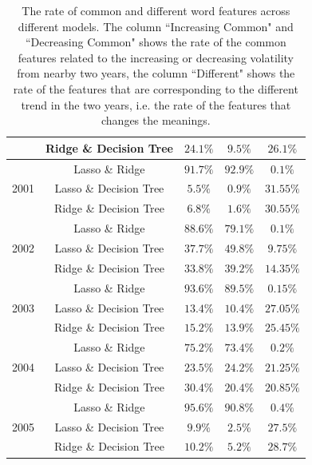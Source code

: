 \documentclass[11pt]{article}
\begin{document}
{\begin{table}[p]
\begin{tabular}{|c|c|c|c|c|}
      \cline{2-5}
                            & Ridge \& Decision Tree & $24.1\%$          & $9.5\%$           & $26.1\%$  \\
      \hline
      \multirow{3}{*}{2001} & Lasso \& Ridge         & $91.7\%$          & $92.9\%$          & $0.1\%$   \\
      \cline{2-5}
                            & Lasso \& Decision Tree & $5.5\%$           & $0.9\%$           & $31.55\%$ \\
      \cline{2-5}
                            & Ridge \& Decision Tree & $6.8\%$           & $1.6\%$           & $30.55\%$ \\
      \hline
      \multirow{3}{*}{2002} & Lasso \& Ridge         & $88.6\%$          & $79.1\%$          & $0.1\%$   \\
      \cline{2-5}
                            & Lasso \& Decision Tree & $37.7\%$          & $49.8\%$          & $9.75\%$  \\
      \cline{2-5}
                            & Ridge \& Decision Tree & $33.8\%$          & $39.2\%$          & $14.35\%$ \\
      \hline
      \multirow{3}{*}{2003} & Lasso \& Ridge         & $93.6\%$          & $89.5\%$          & $0.15\%$  \\
      \cline{2-5}
                            & Lasso \& Decision Tree & $13.4\%$          & $10.4\%$          & $27.05\%$ \\
      \cline{2-5}
                            & Ridge \& Decision Tree & $15.2\%$          & $13.9\%$          & $25.45\%$ \\
      \hline
      \multirow{3}{*}{2004} & Lasso \& Ridge         & $75.2\%$          & $73.4\%$          & $0.2\%$   \\
      \cline{2-5}
                            & Lasso \& Decision Tree & $23.5\%$          & $24.2\%$          & $21.25\%$ \\
      \cline{2-5}
                            & Ridge \& Decision Tree & $30.4\%$          & $20.4\%$          & $20.85\%$ \\
      \hline
      \multirow{3}{*}{2005} & Lasso \& Ridge         & $95.6\%$          & $90.8\%$          & $0.4\%$   \\
      \cline{2-5}
                            & Lasso \& Decision Tree & $9.9\%$           & $2.5\%$           & $27.5\%$  \\
      \cline{2-5}
                            & Ridge \& Decision Tree & $10.2\%$          & $5.2\%$           & $28.7\%$  \\
      \hline
    \end{tabular}
    \caption{The rate of common and different word features across different models. The column ``Increasing Common" and ``Decreasing Common" shows the rate of the common features related to the increasing or decreasing volatility from nearby two years, the column ``Different" shows the rate of the features that are corresponding to the different trend in the two years, i.e. the rate of the features that changes the meanings.}
    \label{table-words-feature-model}
  \end{table}
}
\end{document}
